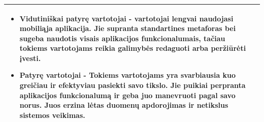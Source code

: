 \documentclass{VUMIFPSkursinis}
\begin{document}
\begin{table}[H]
{\begin{tabular}{|p{}|p{}|}
\begin{itemize}
							  \item	Vidutiniškai patyrę vartotojai - vartotojai lengvai naudojasi mobiliąja aplikacija. Jie supranta standartines metaforas bei sugeba naudotis visais aplikacijos funkcionalumais, tačiau tokiems vartotojams reikia galimybės redaguoti arba peržiūrėti įvesti.

							  \item	Patyrę vartotojai - Tokiems vartotojams yra svarbiausia kuo greičiau ir efektyviau pasiekti savo tikslo. Jie puikiai perpranta aplikacijos funkcionalumą ir geba juo manevruoti pagal savo norus. Juos erzina lėtas duomenų apdorojimas ir netikslus  sistemos veikimas.

						  \end{itemize}      			\\
    \hline
  \end{tabular}}
  \label{tab:pirminiai}
\end{table}
\end{document}
